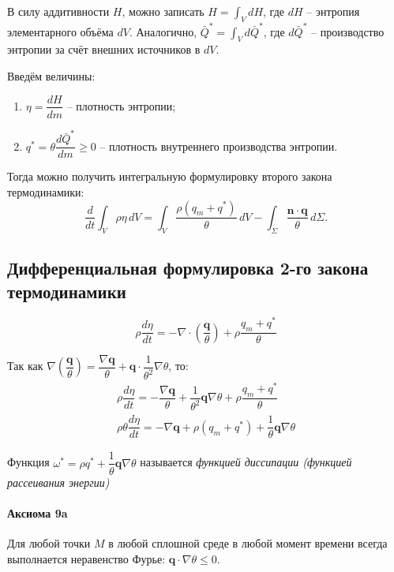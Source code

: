 В силу аддитивности $H$, можно записать $H = \int_V dH$, где $dH$ -- энтропия элементарного
объёма $dV$. Аналогично, $\bar{Q}^* = \int_V d\bar{Q}^*$, где $d\bar{Q}^*$ -- производство
энтропии за счёт внешних источников в $dV$.

\begin{definition}
  Введём величины:
  \begin{enumerate}
    \item $\eta = \dfrac{dH}{dm}$ -- плотность энтропии;
    \item $q^* = \theta \dfrac{d\bar{Q}^*}{dm} \geqslant 0$
      -- плотность внутреннего производства энтропии.
  \end{enumerate}
\end{definition}

Тогда можно получить интегральную формулировку второго закона термодинамики:
\[
  \dfrac{d}{dt} \int_V \rho \eta \, dV = \int_V \dfrac{\rho (q_m + q^*)}{\theta} \, dV
  - \int_\Sigma \dfrac{\mathbf{n} \cdot \mathbf{q}}{\theta} \, d\Sigma.
\]


\subsection{Дифференциальная формулировка 2-го закона термодинамики}

\[
  \rho \dfrac{d\eta}{dt} = - \nabla \cdot \left( \dfrac{\mathbf{q}}{\theta} \right) + \rho \dfrac{q_m + q^*}{\theta}
\]


Так как $\nabla \left( \dfrac{\mathbf{q}}{\theta} \right) = \dfrac{\nabla \mathbf{q}}{\theta} + \mathbf{q} \cdot \dfrac{1}{\theta^2} \nabla \theta$, то:
\begin{align*}
  \rho \dfrac{d\eta}{dt} =
  - \dfrac{\nabla \mathbf{q}}{\theta}
  + \dfrac{1}{\theta^2} \mathbf{q} \nabla \theta
  + \rho \dfrac{q_m + q^*}{\theta} \\
  \rho \theta \dfrac{d\eta}{dt} =
  - \nabla \mathbf{q}
  + \rho (q_m + q^*)
  + \dfrac{1}{\theta} \mathbf{q} \nabla \theta
\end{align*}

\begin{definition}
  Функция $\omega^* = \rho q^* + \dfrac{1}{\theta} \mathbf{q} \nabla \theta$ называется
  \emph{функцией диссипации (функцией рассеивания энергии)}
\end{definition}

\paragraph{Аксиома 9a} Для любой точки $M$ в любой сплошной среде в любой момент времени всегда выполнается неравенство Фурье: $\mathbf{q} \cdot \nabla \theta \leqslant 0$.

